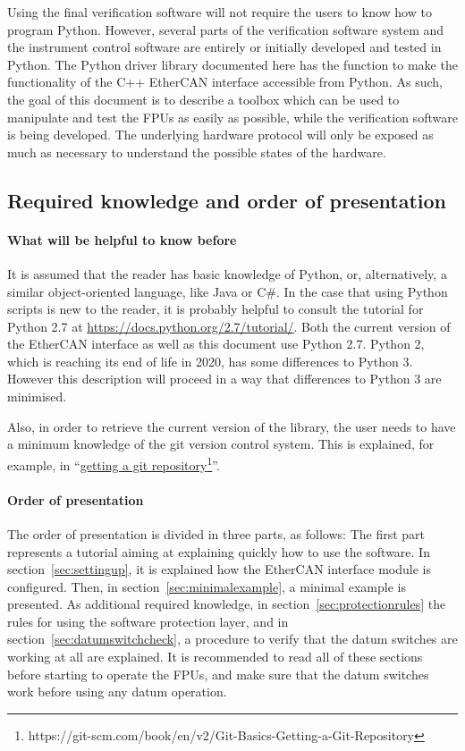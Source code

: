 \documentclass[11pt,a4paper]{scrartcl}
\begin{document}
Using the final verification software will not require the users to
know how to program Python.  However, several parts of the
verification software system and the instrument control software are
entirely or initially developed and tested in Python.  The Python
driver library documented here has the function to make the
functionality of the C++ EtherCAN interface accessible from Python. As
such, the goal of this document is to describe a toolbox which can be
used to manipulate and test the FPUs as easily as possible, while the
verification software is being developed. The underlying hardware
protocol will only be exposed as much as necessary to understand the
possible states of the hardware.



\subsection{Required knowledge and order of presentation}

\paragraph{What will be helpful to know before}
It is assumed that the reader has basic knowledge of Python, or,
alternatively, a similar object-oriented language, like Java or C\#.
In the case that using Python scripts is new to the reader, it is
probably helpful to consult the tutorial for Python 2.7 at
\url{https://docs.python.org/2.7/tutorial/}.  Both the current version
of the EtherCAN interface as well as this document use Python 2.7. Python 2, which
is reaching its end of life in 2020, has some differences to Python
3. However this description will proceed in a way that differences to
Python 3 are minimised.

Also, in order to retrieve the current version of the library, the
user needs to have a minimum knowledge of the git version control
system. This is explained, for example, in
``\href{https://git-scm.com/book/en/v2/Git-Basics-Getting-a-Git-Repository}{getting
  a git repository}\footnote{https://git-scm.com/book/en/v2/Git-Basics-Getting-a-Git-Repository}''.

\paragraph{Order of presentation}
The order of presentation is divided in three parts, as follows: The
first part represents a tutorial aiming at explaining quickly how to
use the software. In section~\ref{sec:settingup}, it is explained how
the EtherCAN interface module is configured. Then, in
section~\ref{sec:minimalexample}, a minimal example is presented. As
additional required knowledge, in section~\ref{sec:protectionrules}
the rules for using the software protection layer, and in
section~\ref{sec:datumswitchcheck}, a procedure to verify that the
datum switches are working at all are explained. It is recommended to
read all of these sections before starting to operate the FPUs, and
make sure that the datum switches work before using any
datum operation.
\end{document}
